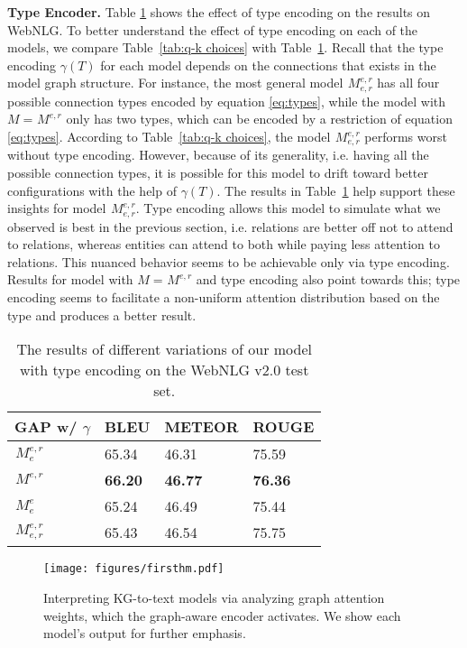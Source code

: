 \documentclass[11pt]{article}
\begin{document}
\noindent\textbf{Type Encoder.} Table \ref{tab:type-enc} shows the effect of type encoding on the results on WebNLG. To better understand the effect of type encoding on each of the models, we compare Table~\ref{tab:q-k choices} with Table~\ref{tab:type-enc}. Recall that the type encoding $\gamma(T)$ for each model depends on the connections that exists in the model graph structure. For instance, the most general model $ {}^{}_{}M^{e,r}_{e,r} $ has all four possible connection types encoded by equation \eqref{eq:types}, while the model with $M={}^{}_{}M^{e,r}_{} $ only has two types, which can be encoded by a restriction of equation \eqref{eq:types}. According to Table~\ref{tab:q-k choices}, the model $ {}^{}_{}M^{e,r}_{e,r} $ performs worst without type encoding. However, because of its generality, i.e. having all the possible connection types, it is possible for this model to drift toward better configurations with the help of $\gamma(T)$. The results in Table~\ref{tab:type-enc} help support these insights for model $ {}^{}_{}M^{e,r}_{e,r} $. Type encoding allows this model to simulate what we observed is best in the previous section, i.e. relations are better off not to attend to relations, whereas entities can attend to both while paying less attention to relations. This nuanced behavior seems to be achievable only via type encoding. Results for model with $ M={}^{}_{}M^{e,r}_{} $ and type encoding also point towards this; type encoding seems to facilitate a non-uniform attention distribution based on the type and produces a better result.

\begin{table}[]
\centering
\begin{tabular}{llll}
\hline
GAP w/ $\gamma$ & BLEU  & METEOR & ROUGE \\ \hline
$ {}^{}_{}M^{e,r}_{e} $ & 65.34 & 46.31 & 75.59 \\ \hline
$ {}^{}_{}M^{e,r}_{} $ &  \textbf{66.20}  &   \textbf{46.77}    &   \textbf{76.36}    \\ \hline
$ {}^{}_{}M^{e}_{e} $ &    65.24   &    46.49   &   75.44    \\ \hline
$ {}^{}_{}M^{e,r}_{e,r} $ & 65.43 & 46.54 & 75.75 \\ \hline
\end{tabular}
\caption{\label{tab:type-enc} The results of different variations of our model with type encoding on the WebNLG v2.0 test set.}
\end{table}

\begin{figure*}[t]
\centering
\texttt{[image: figures/firsthm.pdf]}
\caption{Interpreting KG-to-text models via analyzing graph attention weights, which the graph-aware encoder activates. We show each model's output for further emphasis.}
\label{fig:heatmap}
\end{figure*}
\end{document}
